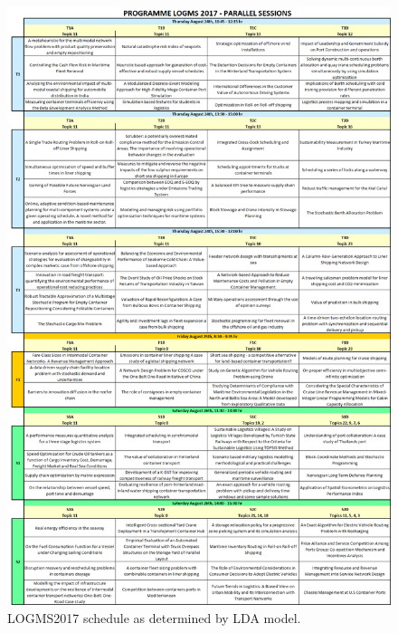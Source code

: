 \documentclass[a4paper, 12pt, twoside]{article}
\numberwithin{equation}{section} %
\begin{document}
\begin{figure}[H]

  \centering
  \includegraphics[scale=0.45]{LOGMS_LDA_Schedule.png}
\caption{LOGMS2017 schedule as determined by LDA model.}
\label{fig:LOGMS2017 LDA schedule}
\end{figure}
\end{document}
